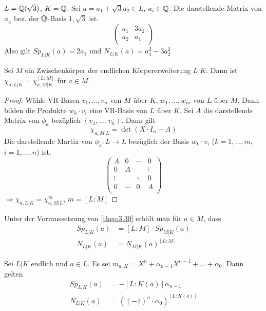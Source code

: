 \documentclass[../main.tex]{subfiles}
\begin{document}
\begin{example}
    $L=\mathbb{Q}(\sqrt{3})$, $K=\mathbb{Q}$.
    Sei $a = a_1+\sqrt{3}a_2\in L$, $a_i \in \mathbb{Q}$.
    Die darstellende Matrix von $\phi_a$ bez. der $\mathbb{Q}$-Basis $1,\sqrt{3}$ ist.
    $$\begin{pmatrix}
        a_1& 3a_2\\
        a_2& a_1\\
    \end{pmatrix}$$
    Also gilt $Sp_{L|K}(a)=2a_1$ und $N_{L|K}(a) = a_1^2-3a_2^2$
\end{example}
\begin{lemma}\label{theo:3.30}
    Sei $M$ ein Zwischenkörper der endlichen Körpererweiterung $L|K$. Dann ist
    $\chi_{a,L|K} = \chi_{a,M|K}^{[L:M]}$ für $a\in M$.
\end{lemma}
\begin{proof}
    Wähle VR-Basen %
    $v_1,\dots,v_n$ von $M$ über $K$,
    $w_1,\dots,w_m$ von $L$ über $M$.
    Dann bilden die Produkte $w_k\cdot v_i$ eine VR-Basis von $L$ über $K$. 
    Sei $A$ die darstellende Matrix von $\phi_a$ bezüglich $(v_1,\dots,v_n)$.
    Dann gilt
    $$\chi_{a,M|L} = \det(X\cdot I_n-A)$$
    Die darstellende Martix von $\phi_a:L\rightarrow L$ bezüglich der Basis $w_k\cdot v_i$ ($k=1,\dots,m$, $i=1,\dots,n$) ist.
    $$\begin{pmatrix}
        A& 0 & \cdots & 0\\
        0& A &   & \vdots\\
        \vdots&  & \ddots & 0\\
        0& \cdots & 0 & A\\
    \end{pmatrix}$$
    $\Rightarrow \chi_{a,L|K} =\chi_{a,M|L}^m$, $m=[L:M]$
\end{proof}
\begin{remark}\label{theo:3.31}
    Unter der Vorraussetzung von \ref{theo:3.30} erhält man für $a\in M$, dass 
    \begin{align*}
        Sp_{L|K}(a) &= [L:M]\cdot Sp_{M|K}(a)\\
        N_{L|K}(a) &= N_{M|K}(a)^{[L:M]}
    \end{align*}
\end{remark}
\begin{theorem} \label{theo:3.32}
    Sei $L|K$ endlich und $a\in L$.
    Es sei $m_{a,K} = X^n+\alpha_{n-1}X^{n-1}+\dots +\alpha_0$.
    Dann gelten
    \begin{align*}
        Sp_{L|K}(a) &= -[L:K(a)]\alpha_{n-1}\\
        N_{L|K} (a) &= \left(\left(-1\right)^n\cdot \alpha_0\right)^{[L:K(a)]}
    \end{align*}
\end{theorem}
\end{document}
